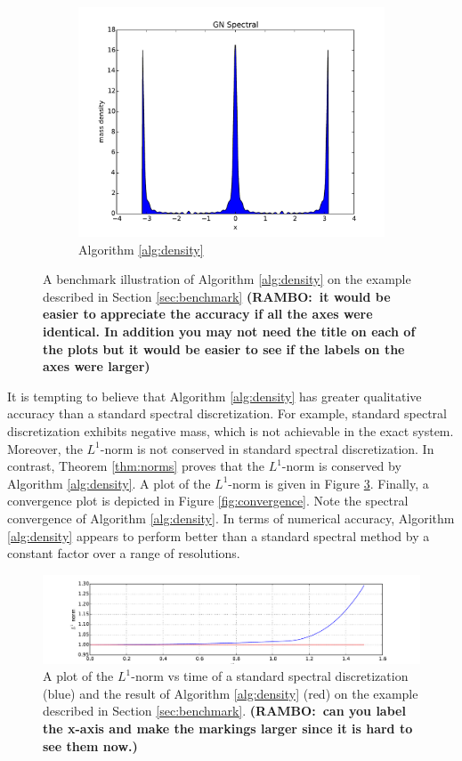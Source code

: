 \documentclass[final,leqno]{siamltex1213}
\newcommand{\ram}[1]{{\normalsize{\textbf{({\color{red}RAMBO:\ }#1)}}}}
\begin{document}
\begin{figure}
\begin{subfigure}{0.36\textwidth}
		\includegraphics[width=\textwidth]{./images/gn_spectral_1D.pdf}
		\caption{Algorithm \ref{alg:density}}
		\label{fig:gn spectral}
	\end{subfigure}
	\caption{A benchmark illustration of Algorithm \ref{alg:density} on the example described in Section \ref{sec:benchmark} \ram{it would be easier to appreciate the accuracy if all the axes were identical. In addition you may not need the title on each of the plots but it would be easier to see if the labels on the axes were larger}}
	\label{fig:S1}
\end{figure}

It is tempting to believe that Algorithm \ref{alg:density} has greater qualitative accuracy than a standard spectral discretization.
For example, standard spectral discretization exhibits negative mass, which is not achievable in the exact system.
Moreover, the $L^{1}$-norm is not conserved in standard spectral discretization.  
In contrast, Theorem \ref{thm:norms} proves that the $L^{1}$-norm is conserved by Algorithm \ref{alg:density}.
A plot of the $L^{1}$-norm is given in Figure \ref{fig:L1}.
Finally, a convergence plot is depicted in Figure \ref{fig:convergence}.  
Note the spectral convergence of Algorithm \ref{alg:density}.
In terms of numerical accuracy, Algorithm \ref{alg:density} appears to perform better than a standard spectral method by a constant factor over a range of resolutions.

\begin{figure}
	\hspace*{-1.2cm}
	\includegraphics[width=1.17\textwidth]{./images/L1_plot.pdf}
	\caption{A plot of the $L^{1}$-norm vs time of a standard spectral discretization (blue) and the result of Algorithm \ref{alg:density} (red) on the example described in Section \ref{sec:benchmark}. \ram{can you label the x-axis and make the markings larger since it is hard to see them now.}}
	\label{fig:L1}
\end{figure}
\end{document}
